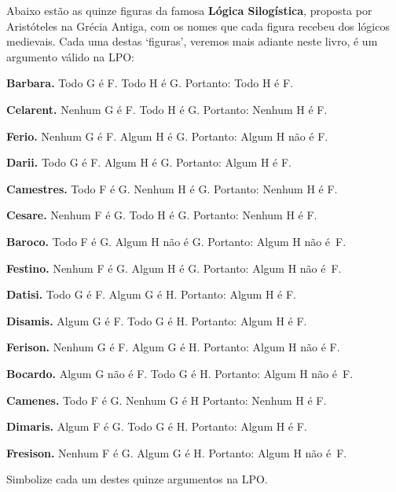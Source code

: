 \practiceproblems
\problempart
\label{pr.BarbaraEtc}
Abaixo estão as quinze figuras da famosa \textbf{Lógica Silogística}, proposta por Aristóteles na Grécia Antiga, com os nomes que cada figura recebeu dos lógicos medievais.
Cada uma destas `figuras', veremos mais adiante neste livro, é um argumento válido na LPO:
\begin{earg}\small 
	\item \textbf{Barbara.} Todo G é F. Todo H é G. Portanto:  Todo H é F.
	\item \textbf{Celarent.} Nenhum G é F. Todo H é G. Portanto: Nenhum H é F.
	\item \textbf{Ferio.} Nenhum G é F. Algum H é G. Portanto: Algum H não é F.
	\item \textbf{Darii.} Todo G é F. Algum H é G. Portanto: Algum H é F.
	\item \textbf{Camestres.} Todo F é G. Nenhum H é G. Portanto: Nenhum H é F.
	\item \textbf{Cesare.} Nenhum F é G. Todo H é G. Portanto: Nenhum H é F.
	\item \textbf{Baroco.} Todo F é G. Algum H não é G. Portanto: Algum H não é~F.
	\item \textbf{Festino.} Nenhum F é G. Algum H é G. Portanto: Algum H não é~F.
	\item \textbf{Datisi.} Todo G é F. Algum G é H. Portanto: Algum H é F.
	\item \textbf{Disamis.} Algum G é F. Todo G é H. Portanto: Algum H é F.
	\item \textbf{Ferison.} Nenhum G é F. Algum G é H. Portanto: Algum H não é F.
	\item \textbf{Bocardo.} Algum G não é F. Todo G é H. Portanto:  Algum H não é~F.
	\item \textbf{Camenes.} Todo F é G. Nenhum G é H Portanto: Nenhum H é F.
	\item \textbf{Dimaris.} Algum F é G. Todo G é H. Portanto: Algum H é F.
	\item \textbf{Fresison.} Nenhum F é G. Algum G é H. Portanto: Algum H não é~F.
\end{earg}
Simbolize cada um destes quinze argumentos na LPO.

\

